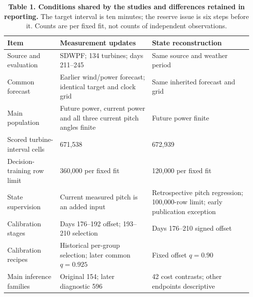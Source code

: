 \begin{table}[H]
\centering
\caption*{\textbf{Table 1. Conditions shared by the studies and differences retained in reporting.} The target interval is ten minutes; the reserve issue is six steps before it. Counts are per fixed fit, not counts of independent observations.}
\small
\begin{tabular}{p{.22\linewidth}p{.35\linewidth}p{.35\linewidth}}
\toprule
Item & Measurement updates & State reconstruction \\
\midrule
Source and evaluation & SDWPF; 134 turbines; days 211--245 & Same source and weather period \\
Common forecast & Earlier wind/power forecast; identical target and clock grid & Same inherited forecast and grid \\
Main population & Future power, current power and all three current pitch angles finite & Future power finite \\
Scored turbine-interval cells & 671,538 & 672,939 \\
Decision-training row limit & 360,000 per fixed fit & 120,000 per fixed fit \\
State supervision & Current measured pitch is an added input & Retrospective pitch regression; 100,000-row limit; early publication exception \\
Calibration stages & Days 176--192 offset; 193--210 selection & Days 176--210 signed offset \\
Calibration recipes & Historical per-group selection; later common $q=0.925$ & Fixed offset $q=0.90$ \\
Main inference families & Original 154; later diagnostic 596 & 42 cost contrasts; other endpoints descriptive \\
\bottomrule
\end{tabular}
\end{table}
